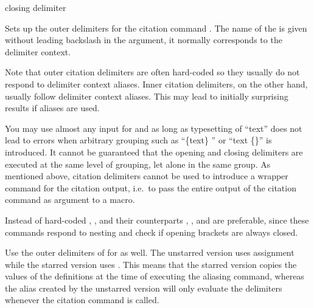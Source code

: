 \documentclass[11pt,a4paper]{article}
\begin{document}
\begin{ltxsyntax}
        {closing delimiter}

Sets up the outer delimiters for the citation command
. The name of the 
is given without leading backslash in the argument, it normally corresponds to
the delimiter context.

Note that outer citation delimiters are often hard-coded so they usually do not
respond to delimiter context aliases.
Inner citation delimiters, on the other hand, usually follow delimiter context
aliases.
This may lead to initially surprising results if aliases are used.

You may use almost any input for  and
 as long as typesetting of
\enquote{text} does not lead to
errors when arbitrary grouping such as
\enquote{\{\allowbreak text\}\allowbreak
{}}
or \enquote{\allowbreak text\allowbreak
\{\}}
is introduced.
It cannot be guaranteed that the opening and closing delimiters are executed
at the same level of grouping, let alone in the same group.
As mentioned above, citation delimiters cannot be used to introduce a
wrapper command for the citation output, i.e.\ to pass the entire output of the
citation command as argument to a macro.

Instead of hard-coded \gencode{(}, \gencode{)}, \gencode{[} and \gencode{]}
their  counterparts , ,
 and  are preferable, since these
commands respond to nesting and check if opening brackets are always closed.


Use the outer delimiters of  for
 as well.
The unstarred version uses  assignment while the starred version uses
. This means that the starred version copies the values of the
definitions at the time of executing the aliasing command,
whereas the alias created by the unstarred version will only evaluate the
delimiters whenever the citation command is called.



\end{ltxsyntax}
\end{document}
